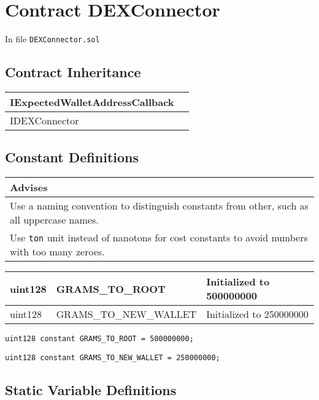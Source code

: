 
\chapter{Contract DEXConnector}


In file {\tt DEXConnector.sol}

\section{Contract Inheritance}


\noindent\begin{tabular}{|l|p{5cm}|}\hline
IExpectedWalletAddressCallback & \\\hline
IDEXConnector & \\\hline
\end{tabular}


\section{Constant Definitions}


\ifsoldraft
\noindent\begin{tabular}{|p{12cm}|}\hline
\rowcolor{green}Advises
\\\hline
Use a naming convention to distinguish constants from other, such as all uppercase names.
\\\hline
Use \verb+ton+ unit instead of nanotons for cost constants to avoid numbers with too many zeroes.
\\\hline\end{tabular}
\fi

\ifsoltables
\noindent\begin{tabular}{|l|l|p{5cm}|}\hline
uint128 & GRAMS\_{}TO\_{}ROOT & Initialized to 500000000  \\\hline
uint128 & GRAMS\_{}TO\_{}NEW\_{}WALLET & Initialized to 250000000  \\\hline
\end{tabular}
\fi


\begin{lstlisting}[firstnumber=19]
  uint128 constant GRAMS_TO_ROOT = 500000000;
\end{lstlisting}

\begin{lstlisting}[firstnumber=20]
  uint128 constant GRAMS_TO_NEW_WALLET = 250000000;
\end{lstlisting}

\section{Static Variable Definitions}


